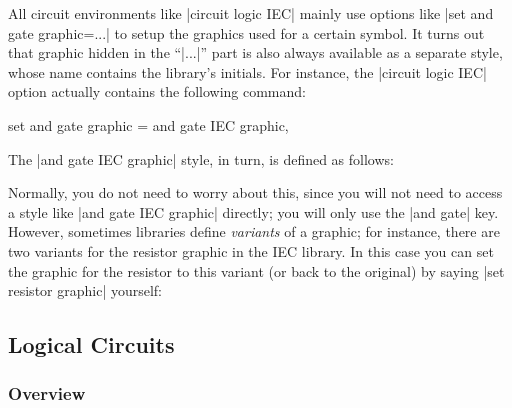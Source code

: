 All circuit environments like |circuit logic IEC| mainly use options
like |set and gate graphic=...| to setup the graphics used for a certain
symbol. It turns out that graphic hidden in the ``|...|'' part is also
always available as a separate style, whose name contains the
library's initials. For instance, the |circuit logic IEC| option
actually contains the following command:
\begin{codeexample}
  set and gate graphic = and gate IEC graphic,
\end{codeexample}
The |and gate IEC graphic| style, in turn, is defined as follows:
\begin{codeexample}
\end{codeexample}

Normally, you do not need to worry about this, since you will not need
to access a style like |and gate IEC graphic| directly; you will only
use the |and gate| key. However, sometimes libraries define
\emph{variants} of a graphic; for instance, there are two variants for
the resistor graphic in the IEC library. In this case you can set the
graphic for the resistor to this variant (or back to the original) by
saying |set resistor graphic| yourself:

\begin{codeexample}[]
\end{codeexample}



\subsection{Logical Circuits}


\subsubsection{Overview}

